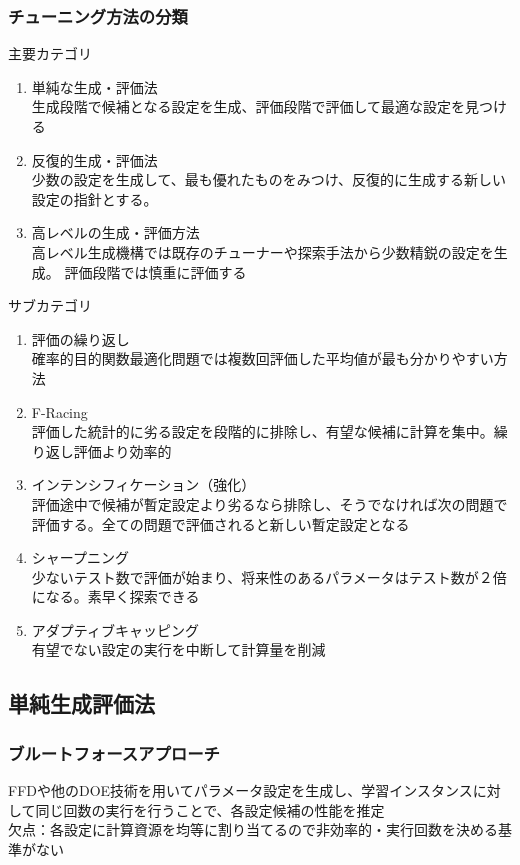 \documentclass[twocolumn]{jarticle}     %
\begin{document}
\subsubsection{チューニング方法の分類}

主要カテゴリ
\begin{enumerate}
  \item 単純な生成・評価法 \\
  生成段階で候補となる設定を生成、評価段階で評価して最適な設定を見つける

  \item 反復的生成・評価法 \\
  少数の設定を生成して、最も優れたものをみつけ、反復的に生成する新しい設定の指針とする。

  \item 高レベルの生成・評価方法 \\
  高レベル生成機構では既存のチューナーや探索手法から少数精鋭の設定を生成。
  評価段階では慎重に評価する
\end{enumerate}

サブカテゴリ
\begin{enumerate}
  \item 評価の繰り返し \\
  確率的目的関数最適化問題では複数回評価した平均値が最も分かりやすい方法

  \item F-Racing \\
  評価した統計的に劣る設定を段階的に排除し、有望な候補に計算を集中。繰り返し評価より効率的

  \item インテンシフィケーション（強化） \\
  評価途中で候補が暫定設定より劣るなら排除し、そうでなければ次の問題で評価する。全ての問題で評価されると新しい暫定設定となる

  \item シャープニング \\
  少ないテスト数で評価が始まり、将来性のあるパラメータはテスト数が２倍になる。素早く探索できる

  \item アダプティブキャッピング  \\
  有望でない設定の実行を中断して計算量を削減
\end{enumerate}

\subsection{単純生成評価法}
\subsubsection{ブルートフォースアプローチ}
FFDや他のDOE技術を用いてパラメータ設定を生成し、学習インスタンスに対して同じ回数の実行を行うことで、各設定候補の性能を推定\\
欠点：各設定に計算資源を均等に割り当てるので非効率的・実行回数を決める基準がない
\end{document}
